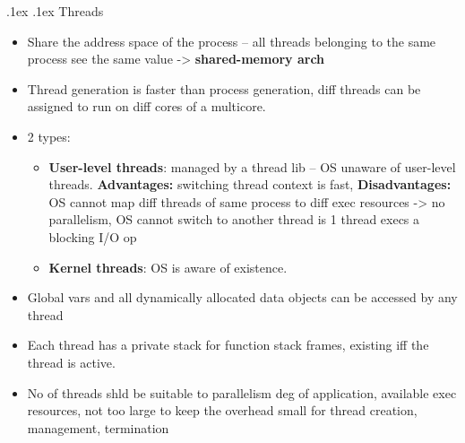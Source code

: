 \documentclass[10pt,landscape,a4paper]{article}
\makeatletter
\renewcommand{\subsubsection}{\@startsection{subsubsection}{1}{0mm}%
  {.1ex}%
  {.1ex}%
{\rmfamily\bfseries}}
\makeatother
\begin{document}
\begin{multicols*}{4}
  \subsubsection{Threads}
  \begin{itemize}
    \item Share the address space of the process -- all threads belonging to the same process see the same value -> \textbf{shared-memory arch}
    \item Thread generation is faster than process generation, diff threads can be assigned to run on diff cores of a multicore.
    \item 2 types:
    \begin{itemize}
      \item \textbf{User-level threads}: managed by a thread lib -- OS unaware of user-level threads. \textbf{Advantages:} switching thread context is fast, \textbf{Disadvantages:} OS cannot map diff threads of same process to diff exec resources -> no parallelism, OS cannot switch to another thread is 1 thread execs a blocking I/O op
      \item \textbf{Kernel threads}: OS is aware of existence.
    \end{itemize}
    \item Global vars and all dynamically allocated data objects can be accessed by any thread
    \item Each thread has a private stack for function stack frames, existing iff the thread is active.
    \item No of threads shld be suitable to parallelism deg of application, available exec resources, not too large to keep the overhead small for thread creation, management, termination
  \end{itemize}

\end{multicols*}
\end{document}
